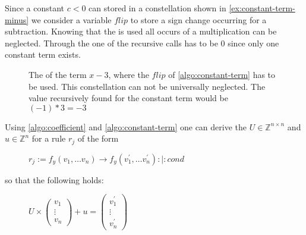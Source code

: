 Since a constant $c < 0$ can stored in a constellation shown in \autoref{ex:constant-term-minus} we consider a variable $flip$ to store a sign change occurring for a subtraction. Knowing that the \stdLinInt is used all occurs of a multiplication can be neglected.\newline %
Through the \stdLinInt one of the recursive calls has to be $0$ since only one constant term exists.

\begin{figure}
	\centering
	\caption{The \rpntree of the term $x-3$, where the $flip$ of \autoref{algo:constant-term} has to be used. This constellation can not be universally neglected. The value recursively found for the constant term would be $(-1)*3 = -3$}
	\label{ex:constant-term-minus}
\end{figure}

\FloatBarrier

Using \autoref{algo:coefficient} and \autoref{algo:constant-term} one can derive the \updatematrix $U \in \mathbb{Z}^{n\times n}$ and \updateconstants $u \in \mathbb{Z}^n$ for a rule $r_j$ of the form
\begin{figure}[H]
	\centering
	$r_j:= f_y(v_1,\dots v_n) \rightarrow f_y(v^\prime_1,\dots v^\prime_n) :|: cond$
\end{figure}  
so that the following holds:
\begin{figure}[H]
	\centering
	$U \times \begin{pmatrix} v_1 \\ \vdots \\ v_n \end{pmatrix} + u = \begin{pmatrix} v^\prime_1 \\ \vdots \\ v^\prime_n \end{pmatrix}$
\end{figure}

